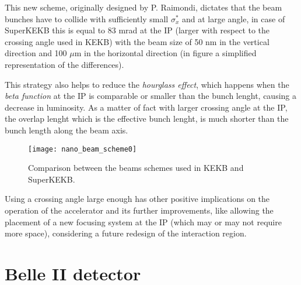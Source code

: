This new scheme, originally designed by P. Raimondi, dictates that the beam bunches have to collide with sufficiently small $\sigma_{x}^{*}$ and at large angle, in case of SuperKEKB this is equal to 83 mrad at the IP (larger with respect to the crossing angle used in KEKB) with the beam size of 50 nm in the vertical direction and 100 $\mu$m in the horizontal direction (in figure  a simplified representation of the differences).

This strategy also helps to reduce the \textit{hourglass effect}, which happens when the \textit{beta function} at the IP is comparable or smaller than the bunch lenght, causing a decrease in luminosity. As a matter of fact with larger crossing angle at the IP, the overlap lenght which is the effective bunch lenght, is much shorter than the bunch length along the beam axis. \\


\begin{figure}[h!]
\centering
\texttt{[image: nano\_beam\_scheme0]}
\caption{Comparison between the beams schemes used in KEKB and SuperKEKB.}
\label{fig:beam_scheme_comparison}
\end{figure}

Using a crossing angle large enough has other positive implications on the operation of the accelerator and its further improvements, like allowing the placement of a new focusing system at the IP (which may or may not require more space), considering a future redesign of the interaction region.

\begin{comment}
In figure \vref{fig:beampar} are reported the main machine parameters (default value) of the SuperKEKB accelerator.

\begin{figure}[h!]
\centering
\texttt{[image: beam\_par]}
\caption{Machine parameters of SuperKEKB. The mark ''*'' indicate values in the IP.}
\label{fig:beampar}
\end{figure}
\end{comment}


\section{Belle II detector}


